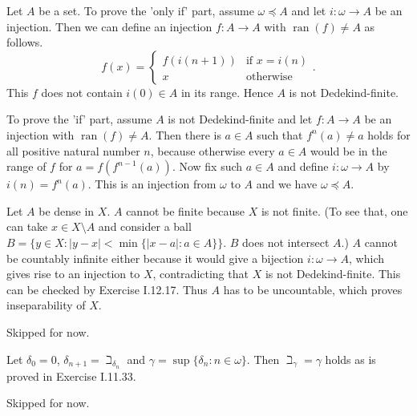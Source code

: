 \documentclass[12pt]{article}
\newcommand{\ran}{\mathop{\mathrm{ran}}}
\theoremstyle{definition}
\newenvironment{customthm}[1]
  {\renewcommand\theinnercustomthm{#1}\innercustomthm}
  {\endinnercustomthm}
\begin{document}
\begin{customthm}{I.12.17} Let $A$ be a set. To prove the 'only if' part, assume $\omega\preccurlyeq A$ and let $i:\omega\rightarrow A$ be an injection. Then we can define an injection $f:A\rightarrow A$ with $\ran(f)\neq A$ as follows.
\[f(x)=
  \begin{cases}
    f(i(n+1)) & \text{if } x=i(n) \\
    x & \text{otherwise}
  \end{cases}.
\]
This $f$ does not contain $i(0)\in A$ in its range. Hence $A$ is not Dedekind-finite.

To prove the 'if' part, assume $A$ is not Dedekind-finite and let $f:A\rightarrow A$ be an injection with $\ran(f)\neq A$. Then there is $a\in A$ such that $f^n(a)\neq a$ holds for all positive natural number $n$, because otherwise every $a\in A$ would be in the range of $f$ for $a=f(f^{n-1}(a))$. Now fix such $a\in A$ and define $i:\omega\rightarrow A$ by $i(n)=f^n(a)$. This is an injection from $\omega$ to $A$ and we have $\omega\preccurlyeq A$.
\end{customthm}

\begin{customthm}{I.12.18} Let $A$ be dense in $X$. $A$ cannot be finite because $X$ is not finite. (To see that, one can take $x\in X\setminus A$ and consider a ball $B=\{y\in X: |y-x|<\min\{|x-a|:a\in A\}\}$. $B$ does not intersect $A$.) $A$ cannot be countably infinite either because it would give a bijection $i:\omega\rightarrow A$, which gives rise to an injection to $X$, contradicting that $X$ is not Dedekind-finite. This can be checked by Exercise I.12.17. Thus $A$ has to be uncountable, which proves inseparability of $X$.
\end{customthm}

\begin{customthm}{I.13.17} Skipped for now.
\end{customthm}

\begin{customthm}{I.13.18} Let $\delta_0=0$, $\delta_{n+1}=\beth_{\delta_n}$ and $\gamma=\sup\{\delta_n:n\in\omega\}$. Then $\beth_\gamma=\gamma$ holds as is proved in Exercise I.11.33.
\end{customthm}

\begin{customthm}{I.13.20} Skipped for now.
\end{customthm}
\end{document}
